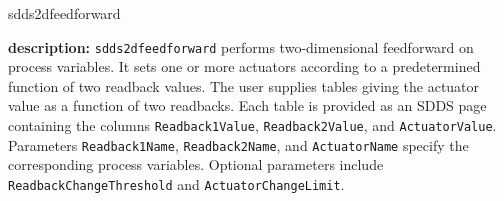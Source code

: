 \begin{sddsprog}{sdds2dfeedforward}
\item \textbf{description:}
\verb+sdds2dfeedforward+ performs two-dimensional feedforward on process variables.
It sets one or more actuators according to a predetermined function of two readback
values.  The user supplies tables giving the actuator value as a function of two
readbacks.  Each table is provided as an SDDS page containing the columns
\verb+Readback1Value+, \verb+Readback2Value+, and \verb+ActuatorValue+.  Parameters
\verb+Readback1Name+, \verb+Readback2Name+, and \verb+ActuatorName+ specify the
corresponding process variables.  Optional parameters include
\verb+ReadbackChangeThreshold+ and \verb+ActuatorChangeLimit+.


\end{sddsprog}
